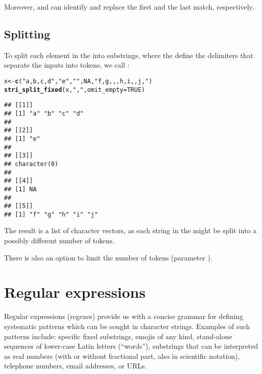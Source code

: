 \documentclass[nojss]{jss}\usepackage[]{graphicx}\usepackage[]{xcolor}
\makeatletter
\newcommand{\hlnum}[1]{\textcolor[rgb]{0.686,0.059,0.569}{#1}}%
\newcommand{\hlstr}[1]{\textcolor[rgb]{0.192,0.494,0.8}{#1}}%
\newcommand{\hlstd}[1]{\textcolor[rgb]{0.345,0.345,0.345}{#1}}%
\newcommand{\hlkwb}[1]{\textcolor[rgb]{0.69,0.353,0.396}{#1}}%
\newcommand{\hlkwc}[1]{\textcolor[rgb]{0.333,0.667,0.333}{#1}}%
\newcommand{\hlkwd}[1]{\textcolor[rgb]{0.737,0.353,0.396}{\textbf{#1}}}%
\newenvironment{kframe}{%
 \def\at@end@of@kframe{}%
 \ifinner\ifhmode%
  \def\at@end@of@kframe{\end{minipage}}%
  \begin{minipage}{\columnwidth}%
 \fi\fi%
 \def\FrameCommand##1{\hskip\@totalleftmargin \hskip-\fboxsep
 \colorbox{shadecolor}{##1}\hskip-\fboxsep
     \hskip-\linewidth \hskip-\@totalleftmargin \hskip\columnwidth}%
 \MakeFramed {\advance\hsize-\width
   \@totalleftmargin\z@ \linewidth\hsize
   \@setminipage}}%
 {\par\unskip\endMakeFramed%
 \at@end@of@kframe}
\newenvironment{knitrout}{}{} %
\makeatother
\begin{document}
Moreover,  and 
can identify and replace the first and the last match, respectively.




\subsection{Splitting}

To  split each element in the  into substrings,
where the  define the delimiters that separate
the inputs into tokens,
we call :

\begin{knitrout}
\color{fgcolor}\begin{kframe}
\begin{alltt}
\hlstd{x} \hlkwb{<-} \hlkwd{c}\hlstd{(}\hlstr{"a,b,c,d"}\hlstd{,} \hlstr{"e"}\hlstd{,} \hlstr{""}\hlstd{,} \hlnum{NA}\hlstd{,} \hlstr{"f,g,,,h,i,,j,"}\hlstd{)}
\hlkwd{stri_split_fixed}\hlstd{(x,} \hlstr{","}\hlstd{,} \hlkwc{omit_empty}\hlstd{=}\hlnum{TRUE}\hlstd{)}
\end{alltt}
\begin{verbatim}
## [[1]]
## [1] "a" "b" "c" "d"
## 
## [[2]]
## [1] "e"
## 
## [[3]]
## character(0)
## 
## [[4]]
## [1] NA
## 
## [[5]]
## [1] "f" "g" "h" "i" "j"
\end{verbatim}
\end{kframe}
\end{knitrout}

The result is a list of character vectors, as each string
in the 
might be split into a possibly different number of tokens.

There is also an option to limit the number of tokens
(parameter ).










\section{Regular expressions}\label{Sec:regex}

Regular expressions (regexes) provide us with a concise
grammar for defining systematic patterns which can be sought in character
strings. Examples of such patterns include:
specific fixed substrings,
emojis of any kind,
stand-alone sequences of lower-case Latin letters (``words''),
substrings that can be interpreted as real numbers (with or without fractional part, also in scientific notation),
telephone numbers,
email addresses, or
URLs.
\end{document}
